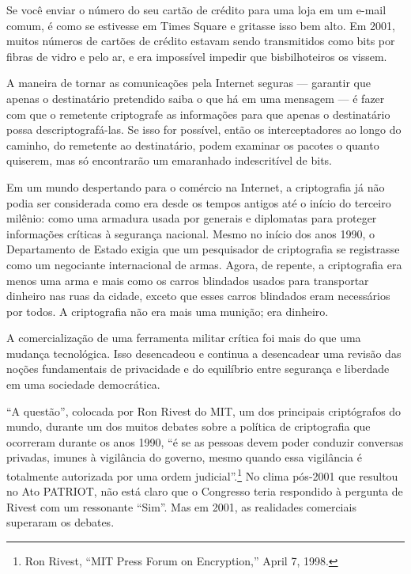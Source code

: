 \documentclass{book}
\begin{document}
Se você enviar o número do seu cartão de crédito para uma loja em um e-mail comum, é como se estivesse em Times Square e gritasse isso bem alto. Em 2001, muitos números de cartões de crédito estavam sendo transmitidos como bits por fibras de vidro e pelo ar, e era impossível impedir que bisbilhoteiros os vissem.

A maneira de tornar as comunicações pela Internet seguras --- garantir que apenas o destinatário pretendido saiba o que há em uma mensagem --- é fazer com que o remetente criptografe as informações para que apenas o destinatário possa descriptografá-las. Se isso for possível, então os interceptadores ao longo do caminho, do remetente ao destinatário, podem examinar os pacotes o quanto quiserem, mas só encontrarão um emaranhado indescritível de bits.

Em um mundo despertando para o comércio na Internet, a criptografia já não podia ser considerada como era desde os tempos antigos até o início do terceiro milênio: como uma armadura usada por generais e diplomatas para proteger informações críticas à segurança nacional. Mesmo no início dos anos 1990, o Departamento de Estado exigia que um pesquisador de criptografia se registrasse como um negociante internacional de armas. Agora, de repente, a criptografia era menos uma arma e mais como os carros blindados usados para transportar dinheiro nas ruas da cidade, exceto que esses carros blindados eram necessários por todos. A criptografia não era mais uma munição; era dinheiro.

A comercialização de uma ferramenta militar crítica foi mais do que uma mudança tecnológica. Isso desencadeou e continua a desencadear uma revisão das noções fundamentais de privacidade e do equilíbrio entre segurança e liberdade em uma sociedade democrática.

``A questão'', colocada por Ron Rivest do MIT, um dos principais criptógrafos do mundo, durante um dos muitos debates sobre a política de criptografia que ocorreram durante os anos 1990, ``é se as pessoas devem poder conduzir conversas privadas, imunes à vigilância do governo, mesmo quando essa vigilância é totalmente autorizada por uma ordem judicial''.\footnote{Ron Rivest, “MIT Press Forum on Encryption,” April 7, 1998.} No clima pós-2001 que resultou no Ato PATRIOT, não está claro que o Congresso teria respondido à pergunta de Rivest com um ressonante ``Sim''. Mas em 2001, as realidades comerciais superaram os debates.
\end{document}
